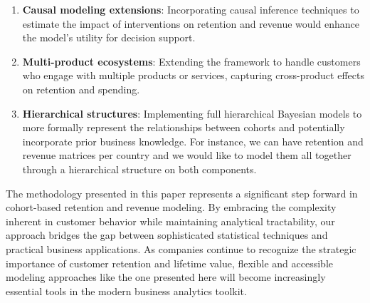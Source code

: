 \documentclass[11pt]{amsart}
\theoremstyle{definition}
\begin{document}
\begin{enumerate}
    \item \textbf{Causal modeling extensions}: Incorporating causal inference techniques to estimate the impact of
          interventions on retention and revenue would enhance the model's utility for decision support.

    \item \textbf{Multi-product ecosystems}: Extending the framework to handle customers who engage with multiple products or
          services, capturing cross-product effects on retention and spending.

    \item \textbf{Hierarchical structures}: Implementing full hierarchical Bayesian models to more formally represent the
          relationships between cohorts and potentially incorporate prior business knowledge. For instance, we can have
          retention and revenue matrices per country and we would like to model them all together through a hierarchical
          structure on both components.
\end{enumerate}

The methodology presented in this paper represents a significant step forward in cohort-based retention and revenue modeling.
By embracing the complexity inherent in customer behavior while maintaining analytical tractability, our approach bridges the
gap between sophisticated statistical techniques and practical business applications. As companies continue to recognize the
strategic importance of customer retention and lifetime value, flexible and accessible modeling approaches like the one presented
here will become increasingly essential tools in the modern business analytics toolkit.



\end{document}
